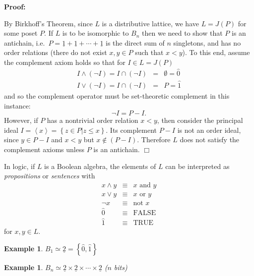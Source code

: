 \documentclass[11pt,english]{article}
\newtheorem{example}[theorem]{Example}
\newenvironment{proof}{\noindent \textbf{Proof:}}{$\Box$}
\begin{document}
\begin{proof}

By Birkhoff's Theorem, since $L$ is a distributive lattice, we have
$L=J\left(P\right)$ for some poset $P$. If $L$ is to be isomorphic
to $B_{n}$ then we need to show that $P$ is an antichain, i.e.\
$P=\underline{1}+\underline{1}+\cdots+\underline{1}$ is the direct
sum of $n$ singletons, and has no order relations (there do not exist $x,y\in P$ such that $x<y$).
To this end, assume the complement axiom holds so that for $I\in L=J\left(P\right)$\begin{eqnarray*}
I\wedge\left(\neg I\right)=I\cap\left(\neg I\right) & = & \emptyset =\hat{0}\\
I\vee\left(\neg I\right)=I\cap\left(\neg I\right) & = & P=\hat{1}\end{eqnarray*}
and so the complement operator must be set-theoretic complement in
this instance: \[
\neg I=P-I.\]
However, if  $P$ has a nontrivial order relation $x<y$, then consider the principal ideal $I=\left\langle x\right\rangle =\left\{ \left.z\in P\right|z\le x\right\}$.  Its complement $P-I$ is not an order ideal, since $y\in P-I$ and $x< y$ but $x\notin\left(P-I\right)$.  Therefore $L$ does not satisfy the complement axioms unless $P$ is an antichain.
\end{proof}

In logic, if $L$ is a Boolean algebra, the elements of $L$ can be interpreted
as \emph{propositions} or \emph{sentences} with\begin{eqnarray*}
x\wedge y & \equiv & x\text{ and }y\\
x\vee y & \equiv & x\text{ or }y\\
\neg x & \equiv & \text{not }x\\
\hat{0} & \equiv & \text{FALSE}\\
\hat{1} & \equiv & \text{TRUE}\end{eqnarray*}
for $x,y\in L$.

\begin{example}

$B_{1}\simeq\underline{2}=\left\{ \hat{0},\hat{1}\right\} $ 

\end{example}

\begin{example}

$B_{n}\simeq\underline{2}\times\underline{2}\times\cdots\times\underline{2}$
($n$ bits)

\end{example}\pagebreak{}
\end{document}

